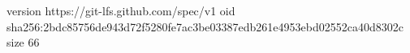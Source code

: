 version https://git-lfs.github.com/spec/v1
oid sha256:2bdc85756de943d72f5280fe7ac3be03387edb261e4953ebd02552ca40d8302c
size 66
